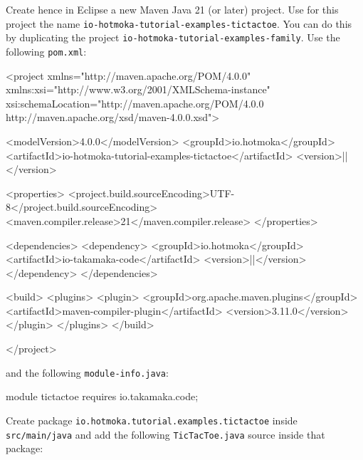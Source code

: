 Create hence in Eclipse a new Maven Java 21 (or later) project. Use for this project the name
\texttt{io-hotmoka-tutorial-examples-tictactoe}.
You can do this by duplicating the project \texttt{io-hotmoka-tutorial-examples-family}.
Use the following \texttt{pom.xml}:
%
\begin{codebox}\begin{xmllst}
<project xmlns="http://maven.apache.org/POM/4.0.0"
    xmlns:xsi="http://www.w3.org/2001/XMLSchema-instance"
    xsi:schemaLocation="http://maven.apache.org/POM/4.0.0 http://maven.apache.org/xsd/maven-4.0.0.xsd">

  <modelVersion>4.0.0</modelVersion>
  <groupId>io.hotmoka</groupId>
  <artifactId>io-hotmoka-tutorial-examples-tictactoe</artifactId>
  <version>|\hotmokaVersion{}|</version>

  <properties>
    <project.build.sourceEncoding>UTF-8</project.build.sourceEncoding>
    <maven.compiler.release>21</maven.compiler.release>
  </properties>

  <dependencies>
    <dependency>
      <groupId>io.hotmoka</groupId>
      <artifactId>io-takamaka-code</artifactId>
      <version>|\takamakaVersion{}|</version>
    </dependency>
  </dependencies>

  <build>
    <plugins>
      <plugin>
        <groupId>org.apache.maven.plugins</groupId>
        <artifactId>maven-compiler-plugin</artifactId>
        <version>3.11.0</version>
      </plugin>
    </plugins>
  </build>

</project>
\end{xmllst}\end{codebox}
%
and the following \texttt{module-info.java}:
%
\begin{codebox}\begin{javalst}
module tictactoe {
  requires io.takamaka.code;
}
\end{javalst}\end{codebox}
%
Create package \texttt{io.hotmoka.tutorial.examples.tictactoe}
inside \texttt{src/main/java} and add
the following \texttt{TicTacToe.java} source inside that package:
%

